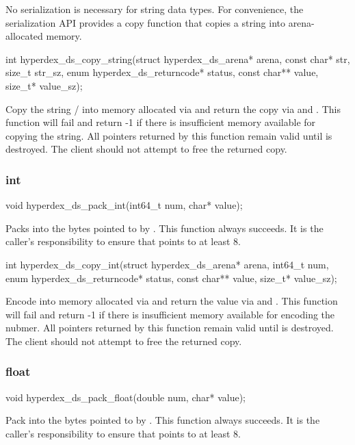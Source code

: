 No serialization is necessary for string data types.  For convenience, the
serialization API provides a copy function that copies a string into
arena-allocated memory.

\begin{ccode}
int hyperdex_ds_copy_string(struct hyperdex_ds_arena* arena, const char* str,
                            size_t str_sz, enum hyperdex_ds_returncode* status,
                            const char** value, size_t* value_sz);
\end{ccode}
\funcdesc  Copy the string / into memory allocated via
 and return the copy via  and .  This
function will fail and return -1 if there is insufficient memory available for
copying the string.  All pointers returned by this function remain valid until
 is destroyed.  The client should not attempt to free the returned
copy.

\subsubsection{int}

\begin{ccode}
void hyperdex_ds_pack_int(int64_t num, char* value);
\end{ccode}
\funcdesc Packs  into the bytes pointed to by .  This
function always succeeds.  It is the caller's responsibility to ensure that
 points to at least \unit{8}{\byte}.

\funcsep
\begin{ccode}
int hyperdex_ds_copy_int(struct hyperdex_ds_arena* arena, int64_t num,
                         enum hyperdex_ds_returncode* status,
                         const char** value, size_t* value_sz);
\end{ccode}
\funcdesc Encode  into memory allocated via  and return
the value via  and .  This function will fail and
return -1 if there is insufficient memory available for encoding the nubmer.
All pointers returned by this function remain valid until  is
destroyed.  The client should not attempt to free the returned copy.

\subsubsection{float}

\begin{ccode}
void hyperdex_ds_pack_float(double num, char* value);
\end{ccode}
\funcdesc Pack  into the bytes pointed to by .  This
function always succeeds.  It is the caller's responsibility to ensure that
 points to at least \unit{8}{\byte}.


